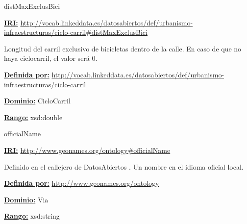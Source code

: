 \begin{mybox}{distMaxExclusBici}
\begin{flushleft}
\underline{\textbf{IRI:}}
\url{http://vocab.linkeddata.es/datosabiertos/def/urbanismo-infraestructuras/ciclo-carril#distMaxExclusBici}
\newline

Longitud del carril exclusivo de bicicletas dentro de la calle.
En caso de que no haya ciclocarril, el valor será 0.
\newline


\underline{\textbf{Definida por:}}\newline
\url{http://vocab.linkeddata.es/datosabiertos/def/urbanismo-infraestructuras/ciclo-carril}
\newline

\underline{\textbf{Dominio:}}
	CicloCarril
\newline

\underline{\textbf{Rango:}}
	xsd:double
\newline

\end{flushleft}
\end{mybox}



\begin{mybox}{officialName}
\begin{flushleft}
\underline{\textbf{IRI:}}
\url{http://www.geonames.org/ontology#officialName}
\newline

Definido en el callejero de DatosAbiertos \cite{ciudadesbiertas_callejero}.
Un nombre en el idioma oficial local.
\newline


\underline{\textbf{Definida por:}}\newline
\url{http://www.geonames.org/ontology}
\newline

\underline{\textbf{Dominio:}}
	Via
\newline

\underline{\textbf{Rango:}}
	xsd:string
\newline


\end{flushleft}
\end{mybox}






